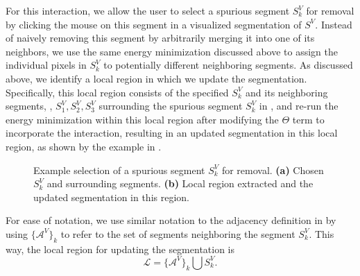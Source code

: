 \documentclass[]{spie}  %
\begin{document}
For this interaction, we allow the user to select a spurious segment
$S^V_k$ for removal by clicking the mouse on this segment in a
visualized segmentation of $S^V$.  Instead of naively removing this
segment by arbitrarily merging it into one of its neighbors, we use
the same energy minimization discussed above to assign the individual
pixels in $S^V_k$ to potentially different neighboring segments.  As
discussed above, we identify a local region in which we update the
segmentation.  Specifically, this local region consists of the
specified $S^V_k$ and its neighboring segments, \eg, $S^V_1, S^V_2,
S^V_3$ surrounding the spurious segment $S^V_k$ in
, and re-run the energy minimization within this
local region after modifying the $\Theta$ term to incorporate the
interaction, resulting in an updated segmentation in this local
region, as shown by the example in .
\begin{figure}[htbp]
\centering
{}
\hspace{0.1em}
\caption{Example selection of a spurious segment $S^V_k$ for removal.
  \textbf{(a)} Chosen $S^V_k$ and surrounding segments.  \textbf{(b)}
  Local region extracted and the updated segmentation in this
  region.} \label{fig:removal-ex}
\end{figure}


For ease of notation, we use similar notation to the adjacency
definition in  by using $\{\mathcal{A}^V\}_k$ to refer to the
set of segments neighboring the segment $S^V_k$.  This way, the local region for updating the segmentation is
\begin{equation}
  \mathcal{L} = \{\mathcal{A}^V\}_k \bigcup S^V_k .
\end{equation}
\end{document}
